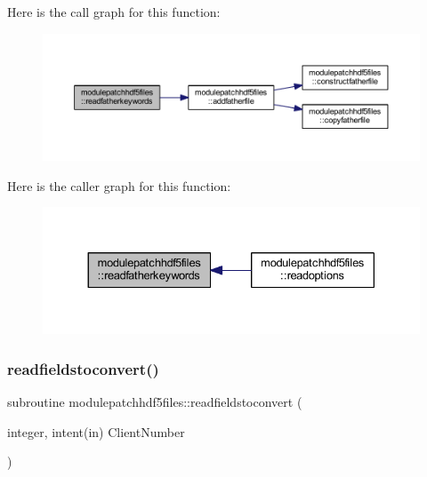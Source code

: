 Here is the call graph for this function\+:\nopagebreak
\begin{figure}[H]
\begin{center}
\leavevmode
\includegraphics[width=350pt]{namespacemodulepatchhdf5files_a82e18c8d58903480429c989b796d36e5_cgraph}
\end{center}
\end{figure}
Here is the caller graph for this function\+:\nopagebreak
\begin{figure}[H]
\begin{center}
\leavevmode
\includegraphics[width=330pt]{namespacemodulepatchhdf5files_a82e18c8d58903480429c989b796d36e5_icgraph}
\end{center}
\end{figure}
\mbox{\label{namespacemodulepatchhdf5files_aae8026a08167779d4648093b3ace8cc4}} 
\subsubsection{\texorpdfstring{readfieldstoconvert()}{readfieldstoconvert()}}
{\footnotesize\ttfamily subroutine modulepatchhdf5files\+::readfieldstoconvert (\begin{DoxyParamCaption}\item[{integer, intent(in)}]{Client\+Number }\end{DoxyParamCaption})\hspace{0.3cm}{\ttfamily [private]}}


